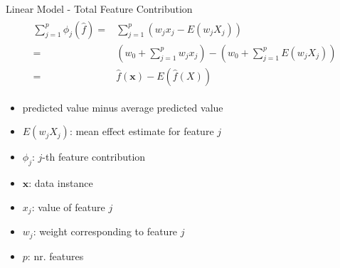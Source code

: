\begin{frame}{Linear Model - Total Feature Contribution}
	\begin{align}
		\begin{split}
			\sum_{j=1}^{p}\phi_j(\hat{f}) =&\sum_{j=1}^p(w_{j}x_j-E(w_{j}X_{j}))\\
			=&(w_0+\sum_{j=1}^pw_{j}x_j)-(w_0+\sum_{j=1}^{p}E(w_{j}X_{j}))\\
			=&\hat{f}(\bm{x})-E(\hat{f}(X))
		\end{split}
	\end{align}
	\begin{itemize}
		\item predicted value minus average predicted value
		\item $E(w_{j}X_{j})$: mean effect estimate for feature $j$
		\item $\phi_j$: $j$-th feature contribution
		\item $\bm{x}$: data instance
		\item $x_j$: value of feature $j$
		\item $w_j$: weight corresponding to feature $j$
		\item $p$: nr. features
	\end{itemize}
\end{frame}